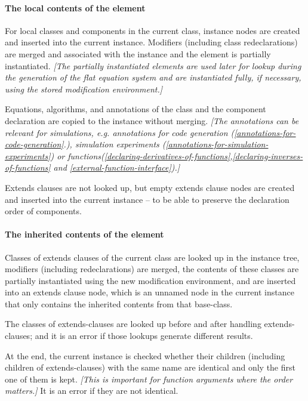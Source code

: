 \documentclass[10pt,a4paper]{report}
\def\doublelabel#1{\label{#1}\hypertarget{#1}{}}
\begin{document}
\paragraph{The local contents of the element}\doublelabel{the-local-contents-of-the-element}

For local classes and components in the current class, instance nodes
are created and inserted into the current instance. Modifiers (including
class redeclarations) are merged and associated with the instance and
the element is partially instantiated. \emph{{[}The partially
instantiated elements are used later for lookup during the generation of
the flat equation system and are instantiated fully, if necessary, using
the stored modification environment.{]}}

Equations, algorithms, and annotations of the class and the component
declaration are copied to the instance without merging. \emph{{[}The
annotations can be relevant for simulations, e.g. annotations for code
generation (\ref{annotations-for-code-generation}.), 
simulation experiments (\ref{annotations-for-simulation-experiments}) 
or functions(\ref{declaring-derivatives-of-functions},\ref{declaring-inverses-of-functions} and \ref{external-function-interface}).{]}}

Extends clauses are not looked up, but empty extends clause nodes are
created and inserted into the current instance -- to be able to preserve
the declaration order of components.

\paragraph{The inherited contents of the element}\doublelabel{the-inherited-contents-of-the-element}

Classes of extends clauses of the current class are looked up in the
instance tree, modifiers (including redeclarations) are merged, the
contents of these classes are partially instantiated using the new
modification environment, and are inserted into an extends clause node,
which is an unnamed node in the current instance that only contains the
inherited contents from that base-class.

The classes of extends-clauses are looked up before and after handling
extends-clauses; and it is an error if those lookups generate different
results.

At the end, the current instance is checked whether their children
(including children of extends-clauses) with the same name are identical
and only the first one of them is kept. \emph{{[}This is important for
function arguments where the order matters.{]}} It is an error if they
are not identical.
\end{document}
